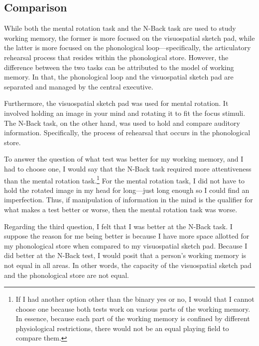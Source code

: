 \documentclass[stu,12pt,floatsintext]{apa7}
\begin{document}
\hypertarget{comparison}{\subsection{Comparison}}

While both the mental rotation task and the N-Back task are used to study working memory, the former is more focused on the visuospatial sketch pad, while the latter is more focused on the phonological loop---specifically, the articulatory rehearsal process that resides within the phonological store. However, the difference between the two tasks can be attributed to the model of working memory. In that, the phonological loop and the visuospatial sketch pad are separated and managed by the central executive.

Furthermore, the visuospatial sketch pad was used for mental rotation. It involved holding an image in your mind and rotating it to fit the focus stimuli. The N-Back task, on the other hand, was used to hold and compare auditory information. Specifically, the process of rehearsal that occurs in the phonological store.

To answer the question of what test was better for my working memory, and I had to choose one, I would say that the N-Back task required more attentiveness than the mental rotation task.\footnote{If I had another option other than the binary yes or no, I would that I cannot choose one because both tests work on various parts of the working memory. In essence, because each part of the working memory is confined by different physiological restrictions, there would not be an equal playing field to compare them.} For the mental rotation task, I did not have to hold the rotated image in my head for long---just long enough so I could find an imperfection. Thus, if manipulation of information in the mind is the qualifier for what makes a test better or worse, then the mental rotation task was worse.

Regarding the third question, I felt that I was better at the N-Back task. I suppose the reason for me being better is because I have more space allotted for my phonological store when compared to my visuospatial sketch pad. Because I did better at the N-Back test, I would posit that a person's working memory is not equal in all areas. In other words, the capacity of the visuospatial sketch pad and the phonological store are not equal.
\end{document}
